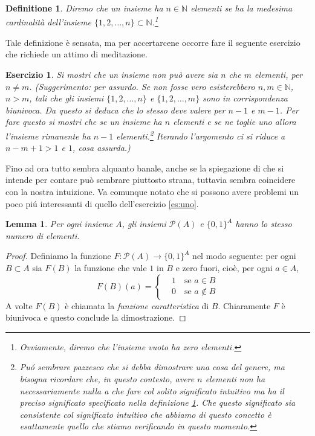\documentclass{amsart}
\newtheorem{lem}[thm]{Lemma}
\newtheorem{defin}[thm]{Definitione}
\newtheorem{es}[thm]{Esercizio}
\newcommand\Pa{{\mathcal P}}
\newcommand\N{{\mathbb N}}
\begin{document}
\begin{defin}\label{def:enum}
Diremo che un insieme ha $n\in\N$ elementi se ha la medesima cardinalit\`a
dell'insieme $\{1,2,\dots,n\}\subset\N$.\footnote{Ovviamente, diremo
che l'insieme vuoto ha zero elementi.}
\end{defin}
Tale definizione \`e sensata, ma per
accertarcene occorre fare il seguente esercizio che richiede un attimo
di meditazione.
\begin{es}\label{es:consi}
Si mostri che un insieme non pu\`o avere sia $n$ che $m$ elementi, per
$n\neq m$. (Suggerimento: per assurdo. Se non fosse vero esisterebbero
$n,m\in\N$, $n>m$, tali che gli insiemi $\{1,2,\dots,n\}$ e
$\{1,2,\dots,m\}$ sono in corrispondenza biunivoca. Da questo si deduca
che lo stesso deve valere per $n-1$ e $m-1$. Per fare questo si mostri
che se un insieme ha $n$ elementi e se ne toglie uno allora l'insieme
rimanente ha $n-1$ elementi.\footnote{Pu\'o sembrare pazzesco che si
debba dimostrare una cosa del genere, ma bisogna ricordare che, in
questo contesto,
\emph{avere $n$ elementi} non ha necessariamente nulla a che fare col
solito significato intuitivo ma ha il preciso significato specificato
nella definizione \ref{def:enum}. Che questo significato sia
consistente col significato intuitivo che abbiamo di questo concetto
\`e esattamente quello che stiamo verificando in questo momento.} 
Iterando l'argomento ci
si riduce a $n-m+1>1$ e $1$, cosa assurda.) 
\end{es}
Fino ad ora tutto sembra alquanto banale, anche se la spiegazione di
che si intende per contare pu\`o sembrare piuttosto strana, tuttavia
sembra coincidere con la nostra intuizione. Va comunque notato che si possono avere
problemi un poco pi\'u interessanti di quello dell'esercizio \ref{es:uno}.
\begin{lem}\label{lem:potfun}
Per ogni insieme $A$, gli insiemi $\Pa(A)$ e $\{0,1\}^A$ hanno lo
stesso numero di elementi.
\end{lem}
\begin{proof}
Definiamo la funzione $F:\Pa(A)\to \{0,1\}^A$ nel modo seguente: per
ogni $B\subset A$ sia $F(B)$ la funzione che vale $1$ in $B$ e zero
fuori, cio\`e, per ogni $a\in A$,
\[
F(B)(a)=\left\{\begin{aligned}
	       &1\quad\text{se }a\in B\\
	       &0\quad\text{se }a\not\in B
               \end{aligned}
\right.
\]
A volte $F(B)$ \`e chiamata la \emph{funzione caratteristica} di
$B$. Chiaramente $F$ \`e biunivoca e questo conclude la dimostrazione.
\end{proof}
\end{document}
